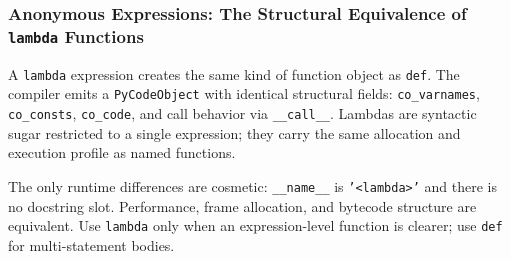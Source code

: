 \subsubsection{Anonymous Expressions: The Structural Equivalence of \texttt{lambda} Functions}

A \texttt{lambda} expression creates the same kind of function object as \texttt{def}. The compiler emits a \texttt{PyCodeObject} with identical structural fields: \texttt{co\_varnames}, \texttt{co\_consts}, \texttt{co\_code}, and call behavior via \texttt{\_\_call\_\_}. Lambdas are syntactic sugar restricted to a single expression; they carry the same allocation and execution profile as named functions.



The only runtime differences are cosmetic: \texttt{\_\_name\_\_} is \texttt{'<lambda>'} and there is no docstring slot. Performance, frame allocation, and bytecode structure are equivalent. Use \texttt{lambda} only when an expression-level function is clearer; use \texttt{def} for multi-statement bodies.
